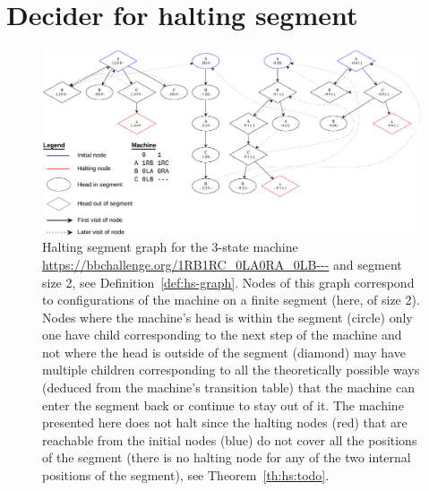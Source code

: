 \section{Decider for halting segment}\label{sec:halting-segment}

\begin{figure}
  \centering
  \includegraphics[width=1\textwidth]{halting-segment.pdf}
  \caption{Halting segment graph for the 3-state machine \url{https://bbchallenge.org/1RB1RC_0LA0RA_0LB---} and segment size 2, see Definition~\ref{def:hs-graph}. Nodes of this graph correspond to configurations of the machine on a finite segment (here, of size 2). Nodes where the machine's head is within the segment (circle) only one have child corresponding to the next step of the machine and not where the head is outside of the segment (diamond) may have multiple children corresponding to all the theoretically possible ways (deduced from the machine's transition table) that the machine can enter the segment back or continue to stay out of it. The machine presented here does not halt since the halting nodes (red) that are reachable from the initial nodes (blue) do not cover all the positions of the segment (there is no halting node for any of the two internal positions of the segment), see Theorem~\ref{th:hs:todo}. }
\end{figure}